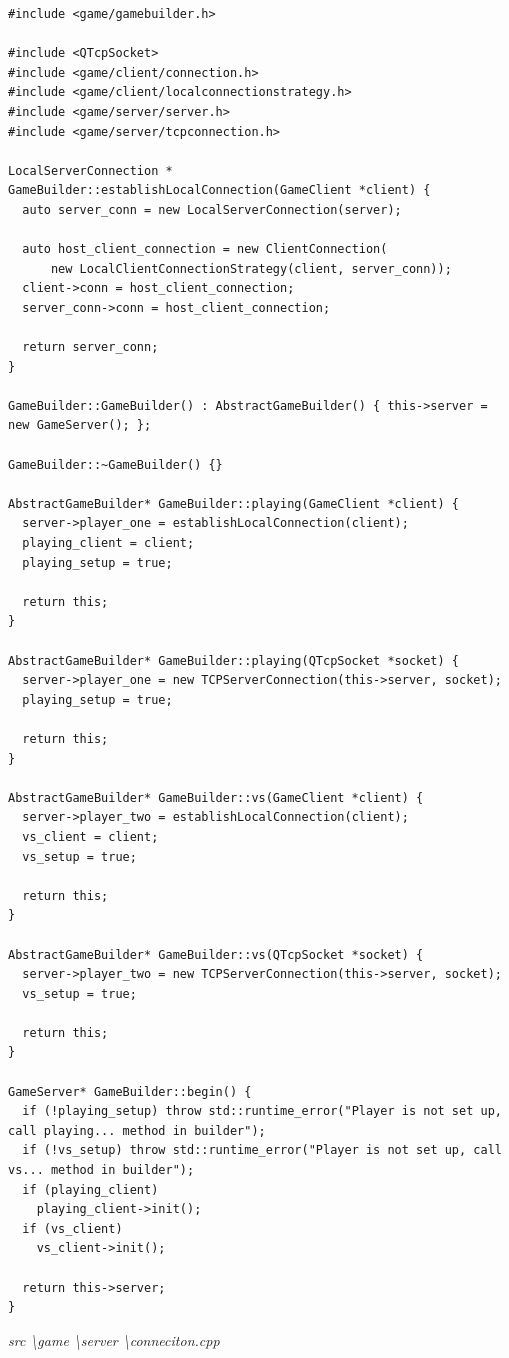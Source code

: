 \documentclass[a4paper,14pt]{extarticle}
\begin{document}
\begin{verbatim}
#include <game/gamebuilder.h>

#include <QTcpSocket>
#include <game/client/connection.h>
#include <game/client/localconnectionstrategy.h>
#include <game/server/server.h>
#include <game/server/tcpconnection.h>

LocalServerConnection *
GameBuilder::establishLocalConnection(GameClient *client) {
  auto server_conn = new LocalServerConnection(server);

  auto host_client_connection = new ClientConnection(
      new LocalClientConnectionStrategy(client, server_conn));
  client->conn = host_client_connection;
  server_conn->conn = host_client_connection;

  return server_conn;
}

GameBuilder::GameBuilder() : AbstractGameBuilder() { this->server = new GameServer(); };

GameBuilder::~GameBuilder() {}

AbstractGameBuilder* GameBuilder::playing(GameClient *client) {
  server->player_one = establishLocalConnection(client);
  playing_client = client;
  playing_setup = true;

  return this;
}

AbstractGameBuilder* GameBuilder::playing(QTcpSocket *socket) {
  server->player_one = new TCPServerConnection(this->server, socket);
  playing_setup = true;

  return this;
}

AbstractGameBuilder* GameBuilder::vs(GameClient *client) {
  server->player_two = establishLocalConnection(client);
  vs_client = client;
  vs_setup = true;

  return this;
}

AbstractGameBuilder* GameBuilder::vs(QTcpSocket *socket) {
  server->player_two = new TCPServerConnection(this->server, socket);
  vs_setup = true;

  return this;
}

GameServer* GameBuilder::begin() {
  if (!playing_setup) throw std::runtime_error("Player is not set up, call playing... method in builder");
  if (!vs_setup) throw std::runtime_error("Player is not set up, call vs... method in builder");
  if (playing_client)
    playing_client->init();
  if (vs_client)
    vs_client->init();

  return this->server;
}

\end{verbatim}
\textit{src \textbackslash game \textbackslash server \textbackslash conneciton.cpp}
\end{document}
